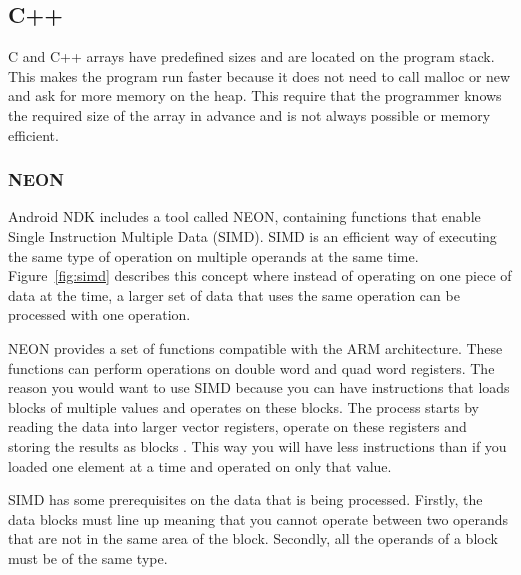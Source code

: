 \subsection{C++}
C and C++ arrays have predefined sizes and are located on the program stack. This makes the program run faster because it does not need to call malloc or new and ask for more memory on the heap. This require that the programmer knows the required size of the array in advance and is not always possible or memory efficient.


\subsubsection{NEON}

Android NDK includes a tool called NEON, containing functions that enable Single Instruction Multiple Data (SIMD). SIMD is an efficient way of executing the same type of operation on multiple operands at the same time. Figure~\ref{fig:simd} describes this concept where instead of operating on one piece of data at the time, a larger set of data that uses the same operation can be processed with one operation.

NEON provides a set of functions compatible with the ARM architecture. These functions can perform operations on double word and quad word registers. The reason you would want to use SIMD because you can have instructions that loads blocks of multiple values and operates on these blocks.  The process starts by reading the data into larger vector registers, operate on these registers and storing the results as blocks \cite{simd:expl}. This way you will have less instructions than if you loaded one element at a time and operated on only that value.

SIMD has some prerequisites on the data that is being processed. Firstly, the data blocks must line up meaning that you cannot operate between two operands that are not in the same area of the block. Secondly, all the operands of a block must be of the same type.

